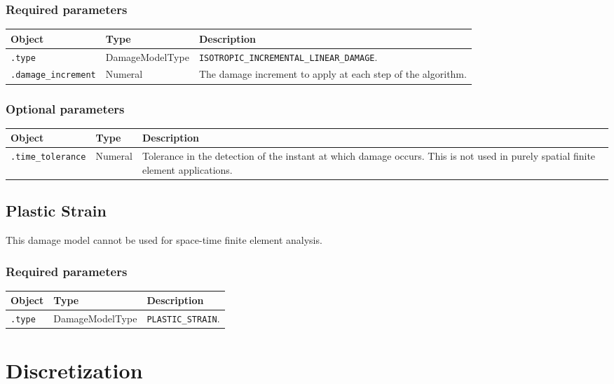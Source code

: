 \documentclass[10pt]{article}
\begin{document}
\subsubsection*{Required parameters}

\begin{tabularx}{\textwidth}{llX}
\hline 
Object & Type & Description \\ 
\hline 
\verb+.type+ & DamageModelType & \verb+ISOTROPIC_INCREMENTAL_LINEAR_DAMAGE+. \\ 
\verb+.damage_increment+ & Numeral & The damage increment to apply at each step of the algorithm. \\
\hline 
\end{tabularx}

\subsubsection*{Optional parameters}

\begin{tabularx}{\textwidth}{llX}
\hline 
Object & Type & Description \\ 
\hline 
\verb+.time_tolerance+ & Numeral & Tolerance in the detection of the instant at which damage occurs. This is not used in purely spatial finite element applications. \\
\hline 
\end{tabularx}

\subsection{Plastic Strain}

This damage model cannot be used for space-time finite element analysis.

\subsubsection*{Required parameters}

\begin{tabularx}{\textwidth}{llX}
\hline 
Object & Type & Description \\ 
\hline 
\verb+.type+ & DamageModelType & \verb+PLASTIC_STRAIN+. \\ 
\hline 
\end{tabularx}

\section{Discretization}
\end{document}
